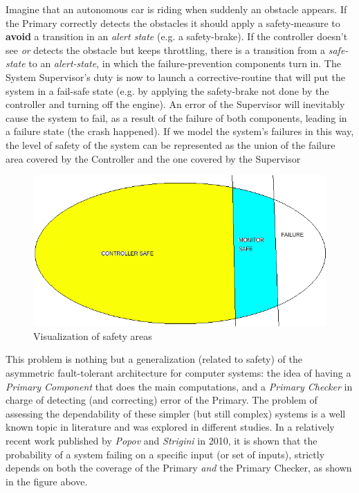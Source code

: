 Imagine that an autonomous car is riding when suddenly an obstacle appears. If the Primary correctly detects the obstacles it should apply a safety-measure to \textbf{avoid} a transition in an \textsl{alert state} (e.g. a safety-brake). If the controller doesn't see \textsl{or} detects the obstacle but keeps throttling, there is a transition from a \textsl{safe-state} to an \textsl{alert-state}, in which the failure-prevention components turn in. The System Supervisor's duty is now to launch a corrective-routine that will put the system in a fail-safe state (e.g. by applying the safety-brake not done by the controller and turning off the engine). An error of the Supervisor will inevitably cause the system to fail, as a result of the failure of both components, leading in a failure state (the crash happened). If we model the system's failures in this way, the level of safety of the system can be represented as the union of the failure area covered by the Controller and the one covered by the Supervisor

\begin{figure}[h!]
	\includegraphics[width=\textwidth]{img/safety-area.png}
	\caption{Visualization of safety areas}
\end{figure}

This problem is nothing but a generalization (related to safety) of the asymmetric fault-tolerant architecture for computer systems: the idea of having a \textsl{Primary Component} that does the main computations, and a \textsl{Primary Checker} in charge of detecting (and correcting) error of the Primary.\newline
The problem of assessing the dependability of these simpler (but still complex) systems is a well known topic in literature and was explored in different studies. In a relatively recent work published by \textsl{Popov} and \textsl{Strigini} in 2010, it is shown that the probability of a system failing on a specific input (or set of inputs), strictly depends on both the coverage of the Primary \textsl{and} the Primary Checker, as shown in the figure above.\cite{striginiPopov}

